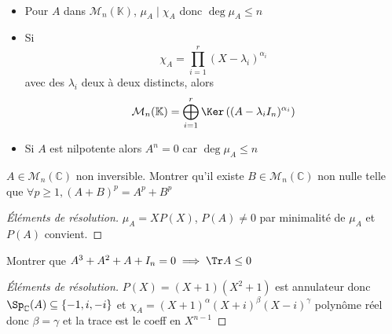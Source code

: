 \begin{csq*}~
    \begin{itemize}
        \item Pour $A$ dans $\mathcal M_n(\mathbb K)$, $\mu_A\;|\;\chi_A$ donc $\deg \mu_A\leq n$
        \item Si \[
                \chi_A=\prod_{i=1}^r(X-\lambda_i)^{\alpha_i}
            \]
            avec des $\lambda_i$ deux à deux distincts, alors \[
                \mathcal M_n(\mathbb K)=\bigoplus_{i=1}^r\Ker\left((A-\lambda_iI_n)^{\alpha_i}\right)
            \]
        \item Si $A$ est nilpotente alors $A^n=0$ car $\deg \mu_A\leq n$
    \end{itemize}
\end{csq*}

\begin{exo}
    $A\in\mathcal M_n(\mathbb C)$ non inversible. Montrer qu'il existe $B\in\mathcal M_n(\mathbb C)$ non nulle telle que $\forall p\geq 1, (A+B)^p=A^p+B^p$
\end{exo}

\begin{proof}[Éléments de résolution]
    $\mu_A=XP(X)$, $P(A)\neq 0$ par minimalité de $\mu_A$ et $P(A)$ convient.
\end{proof}

\begin{exo}
    Montrer que $A^3+A^2+A+I_n=0\implies \Tr A\leq 0$
\end{exo}
\begin{proof}[Éléments de résolution]
    $P(X)=(X+1)(X^2+1)$ est annulateur donc $\Sp_{\mathbb C}(A)\subseteq\{-1, i, -i\}$ et $\chi_A=(X+1)^{\alpha}(X+i)^{\beta}(X-i)^{\gamma}$ polynôme réel donc $\beta=\gamma$ et la trace est le coeff en $X^{n-1}$
\end{proof}

